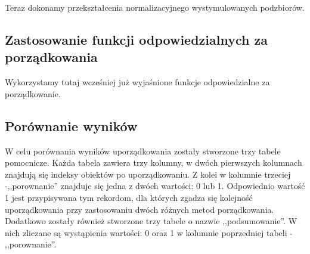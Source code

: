\documentclass[12pt,a4paper]{report}
\begin{document}
{\begin{Shaded}
\begin{Highlighting}[]
\NormalTok{)}
\NormalTok{)}
\NormalTok{)}
\end{Highlighting}
\end{Shaded}

Teraz dokonamy przekształcenia normalizacyjnego wystymulowanych
podzbiorów.

\begin{Shaded}
\begin{Highlighting}[]
\end{Highlighting}
\end{Shaded}

\subsection{Zastosowanie funkcji odpowiedzialnych za porządkowania}
Wykorzystamy tutaj wcześniej już wyjaśnione funkcje odpowiedzialne za porządkowanie. 

\begin{Shaded}
\begin{Highlighting}[]
\end{Highlighting}
\end{Shaded}

\subsection{Porównanie wyników}\label{porownanie-3metody}
W celu porównania wyników uporządkowania zostały stworzone trzy tabele
pomocnicze. Każda tabela zawiera trzy kolumny, w dwóch pierwszych
kolumnach znajdują się indeksy obiektów po uporządkowaniu. Z kolei w
kolumnie trzeciej -,,porownanie'' znajduje się jedna z dwóch wartości: 0
lub 1. Odpowiednio wartość 1 jest przypisywana tym rekordom, dla których
zgadza się kolejność uporządkowania przy zastosowaniu dwóch różnych
metod porządkowania. Dodatkowo zostały również stworzone trzy tabele o
nazwie ,,podsumowanie''. W nich zliczane są wystąpienia wartości: 0 oraz 1 
w kolumnie poprzedniej tabeli - ,,porownanie''.

}
\end{document}
